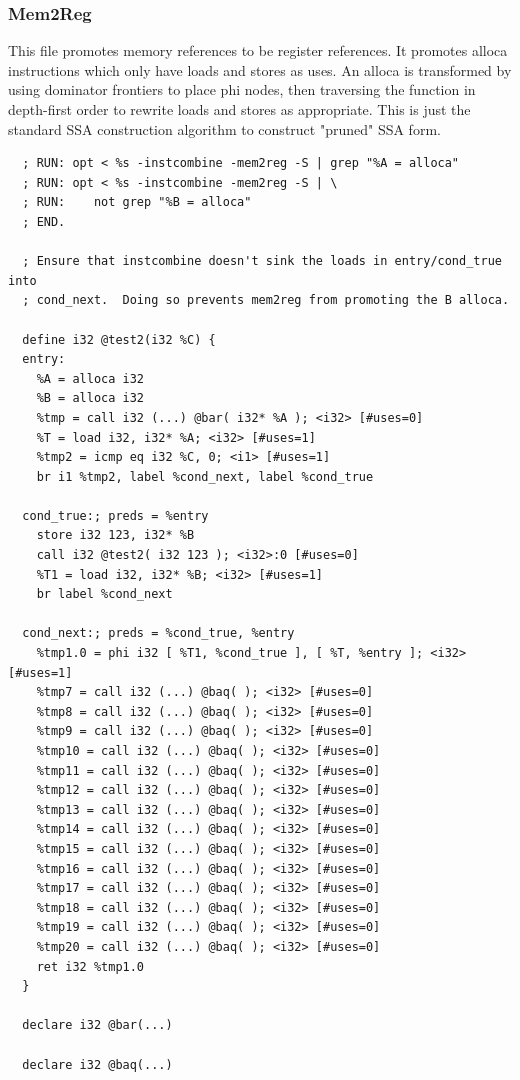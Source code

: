 \documentclass[a4paper]{exam}
\theoremstyle{definition}
\begin{document}
\subsubsection{Mem2Reg}
This file promotes memory references to be register references. It promotes alloca instructions which only have loads and stores as uses. An alloca is transformed by using dominator frontiers to place phi nodes, then traversing the function in depth-first order to rewrite loads and stores as appropriate. This is just the standard SSA construction algorithm to construct "pruned" SSA form.

\begin{verbatim}
  ; RUN: opt < %s -instcombine -mem2reg -S | grep "%A = alloca" 
  ; RUN: opt < %s -instcombine -mem2reg -S | \
  ; RUN:    not grep "%B = alloca"
  ; END.
  
  ; Ensure that instcombine doesn't sink the loads in entry/cond_true into 
  ; cond_next.  Doing so prevents mem2reg from promoting the B alloca.
  
  define i32 @test2(i32 %C) {
  entry:
    %A = alloca i32
    %B = alloca i32
    %tmp = call i32 (...) @bar( i32* %A ); <i32> [#uses=0]
    %T = load i32, i32* %A; <i32> [#uses=1]
    %tmp2 = icmp eq i32 %C, 0; <i1> [#uses=1]
    br i1 %tmp2, label %cond_next, label %cond_true
  
  cond_true:; preds = %entry
    store i32 123, i32* %B
    call i32 @test2( i32 123 ); <i32>:0 [#uses=0]
    %T1 = load i32, i32* %B; <i32> [#uses=1]
    br label %cond_next
  
  cond_next:; preds = %cond_true, %entry
    %tmp1.0 = phi i32 [ %T1, %cond_true ], [ %T, %entry ]; <i32> [#uses=1]
    %tmp7 = call i32 (...) @baq( ); <i32> [#uses=0]
    %tmp8 = call i32 (...) @baq( ); <i32> [#uses=0]
    %tmp9 = call i32 (...) @baq( ); <i32> [#uses=0]
    %tmp10 = call i32 (...) @baq( ); <i32> [#uses=0]
    %tmp11 = call i32 (...) @baq( ); <i32> [#uses=0]
    %tmp12 = call i32 (...) @baq( ); <i32> [#uses=0]
    %tmp13 = call i32 (...) @baq( ); <i32> [#uses=0]
    %tmp14 = call i32 (...) @baq( ); <i32> [#uses=0]
    %tmp15 = call i32 (...) @baq( ); <i32> [#uses=0]
    %tmp16 = call i32 (...) @baq( ); <i32> [#uses=0]
    %tmp17 = call i32 (...) @baq( ); <i32> [#uses=0]
    %tmp18 = call i32 (...) @baq( ); <i32> [#uses=0]
    %tmp19 = call i32 (...) @baq( ); <i32> [#uses=0]
    %tmp20 = call i32 (...) @baq( ); <i32> [#uses=0]
    ret i32 %tmp1.0
  }
  
  declare i32 @bar(...)
  
  declare i32 @baq(...)
\end{verbatim}
\end{document}
